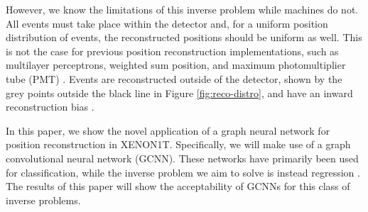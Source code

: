 \documentclass[thesis.tex]{subfiles}
\begin{document}
\par However, we know the limitations of this inverse problem while machines do not.
All events must take place within the detector and, for a uniform position distribution of events, the reconstructed positions should be uniform as well.
This is not the case for previous position reconstruction implementations, such as multilayer perceptrons, weighted sum position, and maximum photomultiplier tube (PMT) \cite{Bart}.
Events are reconstructed outside of the detector, shown by the grey points outside the black line in Figure \ref{fig:reco-distro}, and have an inward reconstruction bias \cite{Bart}.

\par In this paper, we show the novel application of a graph neural network for position reconstruction in XENON1T.
Specifically, we will make use of a graph convolutional neural network (GCNN).
These networks have primarily been used for classification, while the inverse problem we aim to solve is instead regression \cite{GCNN_Kipf}.
The results of this paper will show the acceptability of GCNNs for this class of inverse problems.
\end{document}
